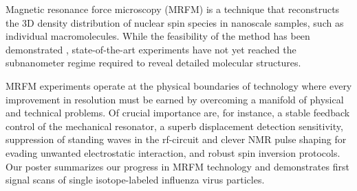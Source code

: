 Magnetic resonance force microscopy (MRFM) is a technique that reconstructs the 3D density distribution of nuclear spin species in nanoscale samples, such as individual macromolecules. While the feasibility of the method has been demonstrated \cite{Degen_2009}, state-of-the-art experiments have not yet reached the subnanometer regime required to reveal detailed molecular structures.

MRFM experiments operate at the physical boundaries of technology where every improvement in resolution must be earned by overcoming a manifold of physical and technical problems. Of crucial importance are, for instance, a stable feedback control of the mechanical resonator, a superb displacement detection sensitivity, suppression of standing waves in the rf-circuit and clever NMR pulse shaping for evading unwanted electrostatic interaction, and robust spin inversion protocols. Our poster summarizes our progress in MRFM technology and demonstrates first signal scans of single isotope-labeled influenza virus particles.